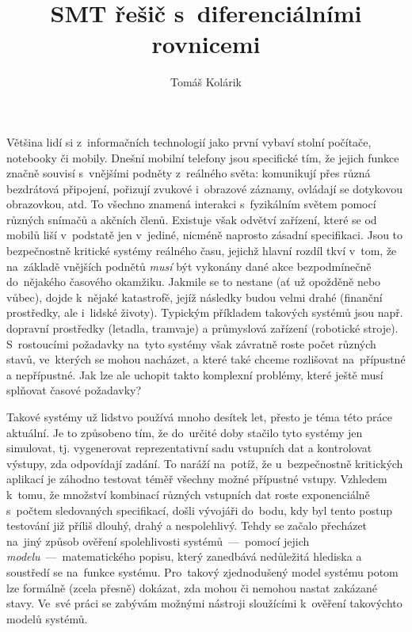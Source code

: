 \documentclass[thesis=M,czech]{FITthesis}[2012/06/26]
\title{SMT řešič s~diferenciálními rovnicemi}
\author{Tomáš Kolárik} %
\newcommand{\hl}[1]{\textit{#1}}
\begin{document}

\begin{introduction}\label{ch:intro}
Většina lidí si z~informačních technologií
jako první vybaví stolní počítače,
notebooky či mobily.
Dnešní mobilní telefony jsou specifické tím,
že jejich funkce značně souvisí s~vnějšími podněty z~reálného světa:
komunikují přes různá bezdrátová připojení,
pořizují zvukové i~obrazové záznamy,
ovládají se dotykovou obrazovkou, atd.
To všechno znamená interakci s~fyzikálním světem
pomocí různých snímačů a akčních členů.
Existuje však odvětví zařízení,
které se od mobilů liší v~podstatě jen v~jediné,
nicméně naprosto zásadní specifikaci.
Jsou to bezpečnostně kritické systémy reálného času,
jejichž hlavní rozdíl tkví v~tom,
že na~základě vnějších podnětů
\hl{musí} být vykonány dané akce
bezpodmínečně do~nějakého časového okamžiku.
Jakmile se to nestane (ať už opožděně nebo vůbec),
dojde k~nějaké katastrofě,
jejíž následky budou velmi drahé
(finanční prostředky, ale i~lidské životy).
Typickým příkladem takových systémů
jsou např. dopravní prostředky (letadla, tramvaje)
a průmyslová zařízení (robotické stroje).
S~rostoucími požadavky na~tyto systémy
však závratně roste počet různých stavů,
ve~kterých se mohou nacházet,
a které také chceme rozlišovat
na~přípustné a nepřípustné.
Jak lze ale uchopit takto komplexní problémy,
které ještě musí splňovat časové požadavky?

Takové systémy už lidstvo používá mnoho desítek let,
přesto je téma této práce aktuální.
Je to způsobeno tím,
že do~určité doby stačilo tyto systémy jen simulovat,
tj. vygenerovat reprezentativní sadu vstupních dat
a kontrolovat výstupy, zda odpovídají zadání.
To naráží na~potíž,
že u~bezpečnostně kritických aplikací je záhodno
testovat téměř všechny možné přípustné vstupy.
Vzhledem k~tomu,
že množství kombinací různých vstupních dat
roste exponenciálně s~počtem sledovaných specifikací,
došli vývojáři do~bodu,
kdy byl tento postup testování již příliš
dlouhý, drahý a nespolehlivý.
Tehdy se začalo přecházet na~jiný způsob
ověření spolehlivosti systémů~---~pomocí
jejich \hl{modelu}~---~matematického popisu,
který zanedbává nedůležitá hlediska
a soustředí se na~funkce systému.
Pro~takový zjednodušený model systému
potom lze formálně (zcela přesně) dokázat,
zda mohou či nemohou nastat zakázané stavy.
Ve~své práci se zabývám možnými nástroji
sloužícími k~ověření takovýchto modelů systémů.


\end{introduction}
\end{document}
